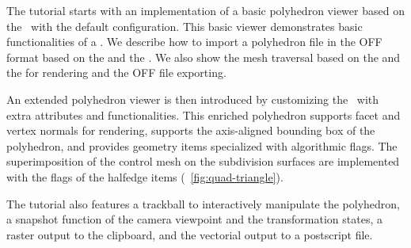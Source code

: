 \documentclass[twocolumn]{article}
\begin{document}

The tutorial starts with an implementation of 
a basic polyhedron viewer based on the \cgalpoly\ with the 
default configuration.
This basic viewer demonstrates basic functionalities of a 
\cgalpoly . We describe how to import a polyhedron file in 
the OFF format based on the  and the 
. We also show the mesh traversal based on
the  and the  for rendering and 
the OFF file exporting. 

An extended polyhedron viewer is then introduced by customizing 
the \poly\ with extra attributes and functionalities. This 
enriched polyhedron supports facet and vertex normals for rendering, 
supports the axis-aligned bounding box of the polyhedron, and 
provides geometry items specialized with algorithmic flags. 
The superimposition of the control mesh on the subdivision surfaces
are implemented with the flags of the halfedge items 
(\figurename\ \ref{fig:quad-triangle}). 

The tutorial also features a trackball to interactively manipulate the
polyhedron, a snapshot function of the camera viewpoint and 
the transformation states, a raster output to the clipboard, and the
vectorial output to a postscript file.%
\end{document}
